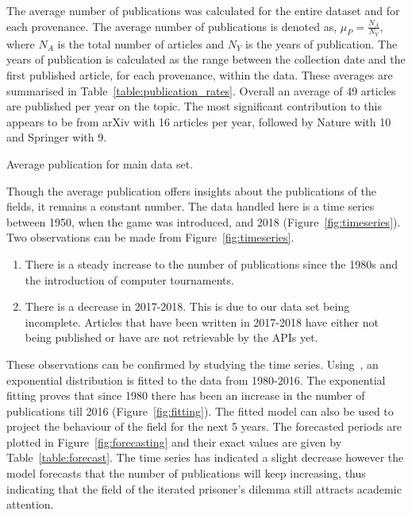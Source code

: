 \documentclass{article}
\theoremstyle{definition}
\begin{document}
The average number of publications was calculated for the entire dataset and for
each provenance. The average number of publications is denoted as,
\(\mu_P = \frac{N_A}{N_Y},\) where \(N_A\) is the total number of articles and
\(N_Y\) is the years of publication. The years of publication is calculated as
the range between the collection date and the first published article, for each provenance,
within the data.
These averages are summarised in Table~\ref{table:publication_rates}.
Overall an average of 49 articles are published per year on the topic. The most
significant contribution to this appears to be from arXiv with 16 articles per year,
followed by Nature with 10 and Springer with 9.

\begin{table}[!hbtp]
    \begin{center}
    
    \end{center}
    \caption{Average publication for main data set.} %
    \label{table:publication_rates}
\end{table}

Though the average publication offers insights about the publications of the
fields, it remains a constant number. The data handled here is a time
series between 1950, when the game was introduced, and 2018 (Figure~\ref{fig:timeseries}). 
Two observations can be made from Figure~\ref{fig:timeseries}.

\begin{enumerate}
    \item There is a steady increase to the number of publications since the 1980s
    and the introduction of computer tournaments.
    \item There is a decrease in 2017-2018. This is due to our data set being incomplete.
    Articles that have been written in 2017-2018 have either not being published
    or have are not retrievable by the APIs yet.
\end{enumerate}

These observations can be confirmed by studying the time series.
Using~\cite{scipy}, an exponential distribution is fitted to
the data from 1980-2016. The exponential fitting proves that since 1980 there has
been an increase in the number of publications till 2016 (Figure~\ref{fig:fitting}).
The fitted model can also be used to project the behaviour of the field for the next 
5 years. The forecasted periods are plotted in Figure~\ref{fig:forecasting} and
their exact values are given by Table~\ref{table:forecast}. The time series
has indicated a slight decrease however the model forecasts that the number
of publications will keep increasing, thus indicating that the field of the iterated
prisoner's dilemma still attracts academic attention.
\end{document}
